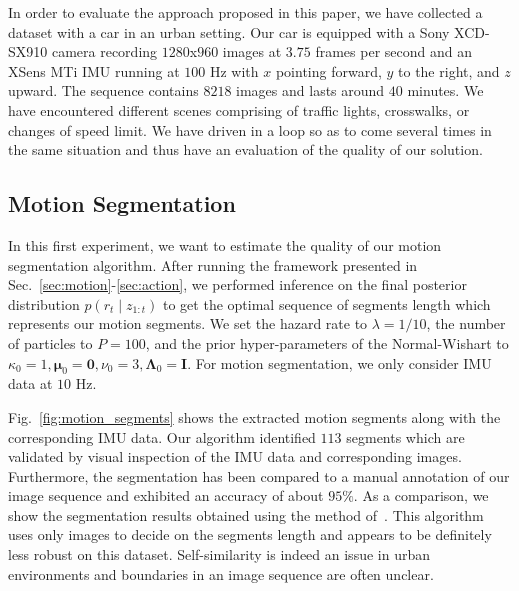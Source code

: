 In order to evaluate the approach proposed in this paper, we have collected
a dataset with a car in an urban setting. Our car is equipped with a Sony
XCD-SX910 camera recording $1280$x$960$ images at $3.75$ frames per second and
an XSens MTi IMU running at $100$ Hz with $x$ pointing forward, $y$ to the
right, and $z$ upward. The sequence contains $8218$ images and lasts around $40$
minutes. We have encountered different scenes comprising of traffic lights,
crosswalks, or changes of speed limit. We have driven in a loop so as to come
several times in the same situation and thus have an evaluation of the quality
of our solution.

\subsection{Motion Segmentation}
In this first experiment, we want to estimate the quality of our
motion segmentation algorithm. After running the framework presented
in Sec.~\ref{sec:motion}-\ref{sec:action}, we performed inference on
the final posterior distribution $p(r_t\mid z_{1:t})$ to get the
optimal sequence of segments length which represents our motion
segments. We set the hazard rate to $\lambda=1/10$, the number of
particles to $P=100$, and the prior hyper-parameters of the
Normal-Wishart to $\kappa_0=1, \boldsymbol{\mu}_0= \mathbf{0},\nu_0=3,
\boldsymbol{\Lambda}_0=\mathbf{I}$. For motion segmentation, we only
consider IMU data at $10$ Hz.

Fig.~\ref{fig:motion_segments} shows the extracted motion segments along with
the corresponding IMU data. Our algorithm identified $113$ segments which are
validated by visual inspection of the IMU data and corresponding images.
Furthermore, the segmentation has been compared to a manual annotation of our
image sequence and exhibited an accuracy of about $95\%$. As a
comparison, we show the segmentation results obtained using the method
of~\cite{ranganathan10pliss}. This algorithm uses only images to decide on the
segments length and appears to be definitely less robust on this dataset.
Self-similarity is indeed an issue in urban environments and boundaries in an
image sequence are often unclear.

